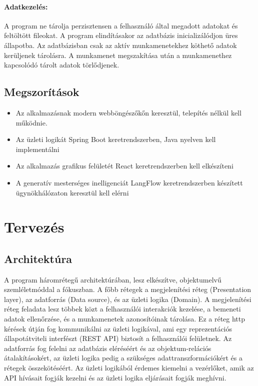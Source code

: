 \paragraph{Adatkezelés:}

A program ne tárolja perzisztensen a felhasználó által megadott adatokat és feltöltött fileokat. A program elindításakor az adatbázis inicializálódjon üres állapotba. Az adatbázisban csak az aktív munkamenetekhez köthető adatok kerüljenek tárolásra. A munkamenet megszakítása után a munkamenethez kapcsolódó tárolt adatok törlődjenek.


\subsection{Megszorítások}

\begin{itemize} 
    \item Az alkalmazásnak modern webböngészőkőn keresztül, telepítés nélkül kell működnie.
    \item Az üzleti logikát Spring Boot keretrendszerben, Java nyelven kell implementálni
    \item   Az alkalmazás grafikus felületét React keretrendszerben kell elkészíteni
    \item A generatív mesterséges inelligenciát LangFlow keretrendszerben készített ügynökhálózaton keresztül kell elérni
\end{itemize}

\section{Tervezés}

\subsection{Architektúra}

A program háromrétegű architektúrában, lesz elkészítve, objektumelvű szemléletmóddal a fókuszban. A főbb rétegek a megjelenítési réteg (Presentation layer), az adatforrás (Data source), és az üzleti logika (Domain). A megjelenítési réteg feladata lesz többek közt a felhasználói interakciók kezelése, a bemeneti adatok ellenőrzése, és a munkamenetek azonosítóinak tárolása. Ez a réteg http kérések útján fog kommunikálni az üzleti logikával, ami egy reprezentációs állapotátviteli interfészt (REST API) biztosít a felhasználói felületnek. Az adatforrás fog felelni az adatbázis eléréséért és az objektum-relációs átalakításokért, az üzleti logika pedig a szükséges adattranszformációkért és a rétegek összekötéséért. Az üzleti logikából érdemes kiemelni a vezérlőket, amik az API hívásait fogják kezelni és az üzleti logika eljárásait fogják meghívni.

